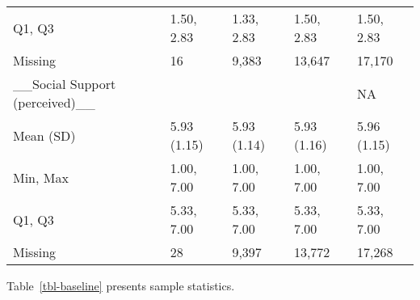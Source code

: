 \documentclass[
  single column]{article}
\begin{document}
\begin{longtable}[t]{lllll}
Q1, Q3 & 1.50, 2.83 & 1.33, 2.83 & 1.50, 2.83 & 1.50, 2.83\\
Missing & 16 & 9,383 & 13,647 & 17,170\\
\_\_Social Support (perceived)\_\_ &   ~~&   ~~&   ~~& NA\\
\addlinespace
Mean (SD) & 5.93 (1.15) & 5.93 (1.14) & 5.93 (1.16) & 5.96 (1.15)\\
Min, Max & 1.00, 7.00 & 1.00, 7.00 & 1.00, 7.00 & 1.00, 7.00\\
Q1, Q3 & 5.33, 7.00 & 5.33, 7.00 & 5.33, 7.00 & 5.33, 7.00\\
Missing & 28 & 9,397 & 13,772 & 17,268\\
\bottomrule

\end{longtable}

Table~\ref{tbl-baseline} presents sample statistics.
\end{document}
